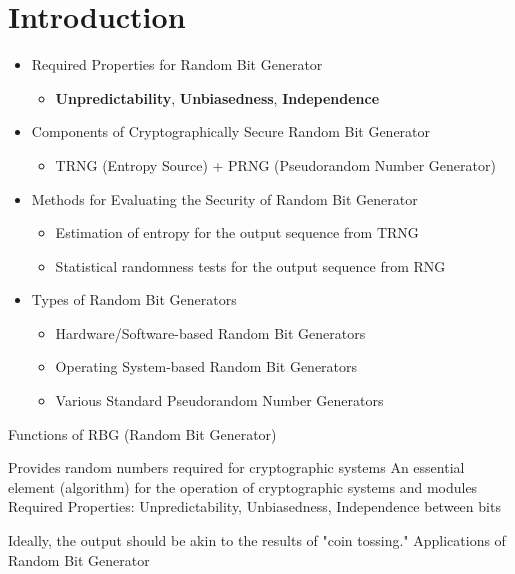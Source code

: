 \documentclass[12pt,openany]{book}
\theoremstyle{definition}
\begin{document}
	\chapter{Introduction}
	\begin{tcolorbox}[colback=white,colframe=defcolor,arc=5pt,title={\color{white}\bf Summary}]
		 \begin{itemize}
		 	\item Required Properties for Random Bit Generator
		 	\begin{itemize}
		 		\item \textbf{Unpredictability}, \textbf{Unbiasedness}, \textbf{Independence}
		 	\end{itemize}
		 	\item Components of Cryptographically Secure Random Bit Generator
		 	\begin{itemize}
		 		\item TRNG (Entropy Source) + PRNG (Pseudorandom Number Generator)
		 	\end{itemize}
		 	\item Methods for Evaluating the Security of Random Bit Generator
		 	\begin{itemize}
		 		\item Estimation of entropy for the output sequence from TRNG
		 		\item Statistical randomness tests for the output sequence from RNG
		 	\end{itemize}
		 	\item Types of Random Bit Generators
		 	\begin{itemize}
		 		\item Hardware/Software-based Random Bit Generators
		 		\item Operating System-based Random Bit Generators
		 		\item Various Standard Pseudorandom Number Generators
		 	\end{itemize}
		 	\end{itemize}
	\end{tcolorbox}
	 Functions of RBG (Random Bit Generator)
	
	Provides random numbers required for cryptographic systems
	An essential element (algorithm) for the operation of cryptographic systems and modules
	 Required Properties: Unpredictability, Unbiasedness, Independence between bits
	
	Ideally, the output should be akin to the results of "coin tossing."
	 Applications of Random Bit Generator
	
\end{document}
